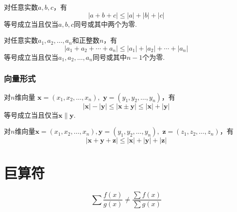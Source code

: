 对任意实数$a,b,c$，有
\begin{equation}
	|a+b+c| \leq |a|+|b|+|c|
\end{equation}
等号成立当且仅当$a,b,c$同号或其中两个为零.

对任意实数$a_1,a_2,\dots,a_n$和正整数$n$，有
\begin{equation}
	|a_1+a_2+\cdots+a_n| \leq |a_1|+|a_2|+\cdots+|a_n|
\end{equation}
等号成立当且仅当$a_1,a_2,\dots,a_n$同号或其中$n-1$个为零.

\subsubsection{向量形式}
对$n$维向量 
$\pmb{x}=(x_1,x_2,\dots,x_n),$
$\pmb{y}=(y_1,y_2,\dots,y_n)$，有
\begin{equation}
	|\pmb{x}|-|\pmb{y}|\leqslant |\pmb{x}\pm\pmb{y}|\leqslant |\pmb{x}|+|\pmb{y}|
\end{equation}
等号成立当且仅当$\pmb{x}\parallel\pmb{y}$.

对$n$维向量$\pmb{x}=(x_1,x_2,\dots,x_n),\pmb{y}=(y_1,y_2,\dots,y_n),$
$\pmb{z}=(z_1,z_2,\dots,z_n)$，有
\begin{equation}
	|\pmb{x}+\pmb{y}+\pmb{z}| \leq |\pmb{x}|+|\pmb{y}|+|\pmb{z}|
\end{equation}

\section{巨算符} \label{giant-operator}

\cite[page A36]{stewart}
\[
    \sum \dfrac{f(x)}{g(x)} \neq \dfrac{\sum f(x)}{\sum g(x)}
\]
